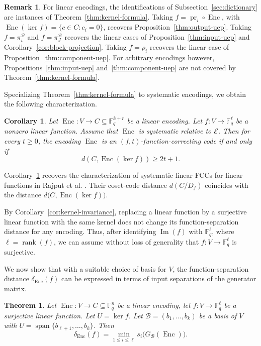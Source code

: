 \documentclass[a4paper,12pt]{article}
\theoremstyle{plain}
\newtheorem{theorem}[lemma]{Theorem}
\newtheorem{corollary}[lemma]{Corollary}
\theoremstyle{definition}
\newtheorem{remark}[lemma]{Remark}
\newcommand{\F}{\mathbb F}
\newcommand{\Enc}{\operatorname{Enc}}
\newcommand{\Imf}{\operatorname{Im}}
\newcommand{\rank}{\operatorname{rank}}
\newcommand{\pr}{\operatorname{pr}}
\begin{document}
\begin{remark}\label{rem:kernel-specializations}
For linear encodings, the identifications of
Subsection~\ref{sec:dictionary} are instances of
Theorem~\ref{thm:kernel-formula}.  
Taking $f=\pr_i\circ\Enc$, with
$\Enc(\ker f)=\{c\in C:c_i=0\}$, recovers
Proposition~\ref{thm:output-uep}.
Taking $f=\pi_i^{\mathcal B}$ and
$f=\pi_J^{\mathcal B}$ recovers the linear cases of
Proposition~\ref{thm:input-uep} and
Corollary~\ref{cor:block-projection}.
Taking $f=\rho_i$ recovers the linear
case of Proposition~\ref{thm:component-uep}. 
For arbitrary encodings
however, Propositions~\ref{thm:input-uep}
and~\ref{thm:component-uep} are not covered by
Theorem~\ref{thm:kernel-formula}.
\end{remark}

Specializing Theorem~\ref{thm:kernel-formula} to systematic encodings, we obtain the following characterization.
\begin{corollary}
\label{cor:linear-fcc-criterion}
Let $\Enc\colon V\to C\subseteq\F_q^{k+r}$ be a linear encoding. Let $f\colon V\to \F_q^\ell$ be
a nonzero linear function. Assume that $\Enc$ is systematic
relative to $\mathcal E$. Then for every 
$t\geq0$, the encoding $\Enc$ is an $(f,t)$-function-correcting code
if and only if
\[
d(C,\Enc(\ker f))\geq 2t+1.
\]
\end{corollary}
Corollary~\ref{cor:linear-fcc-criterion} recovers the characterization of systematic linear FCCs for linear
functions in Rajput et al. \cite[Section VII.A]{rajput2026}. 
Their coset-code distance $d(C/D_f)$ coincides with the  distance
$d\bigl(C,\Enc(\ker f)\bigr)$.
 
 
By Corollary~\ref{cor:kernel-invariance}, replacing a linear
function by a surjective linear function with the same kernel does
not change its function-separation distance for any encoding.
Thus, after identifying $\Imf(f)$ with $\F_q^\ell$, where
$\ell=\rank(f)$, we can assume without loss
of generality that  $f\colon V\to\F_q^\ell$ is surjective.

We now show that with a suitable choice of basis for $V$, the function-separation distance $\delta_{\Enc}(f)$ can be expressed in terms of input separations of the generator matrix. 

\begin{theorem}\label{thm:adapted-basis}
Let $\Enc\colon V\to C\subseteq\F_q^n$ be a linear encoding, let
$f\colon V\to\F_q^\ell$ be a surjective linear function.
Let $U=\ker f$.
Let $\mathcal B=(b_1,\dots,b_k)$ be a basis of $V$ with
$U=\operatorname{span}\{b_{\ell+1},\dots,b_k\}$. Then
\[
\delta_{\Enc}(f)
=
\min_{1\leq i\leq \ell}s_i\bigl(G_{\mathcal B}(\Enc)\bigr).
\]

\end{theorem}
\end{document}
